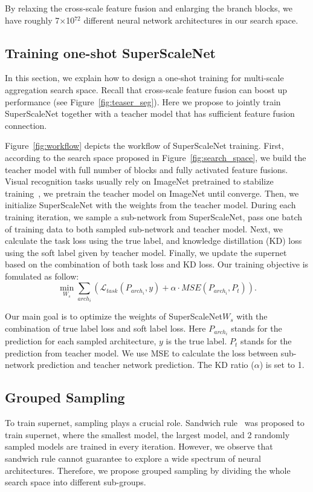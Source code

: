 \documentclass[final]{cvpr}
\newcommand{\supernet}{SuperScaleNet\xspace}
\begin{document}
By relaxing the cross-scale feature fusion and enlarging the branch blocks, we have roughly 7$\times$10$^{72}$  different neural network architectures in our search space.



\subsection{Training one-shot \supernet}
In this section, we explain how to design a one-shot training for multi-scale aggregation search space. 
Recall that cross-scale feature fusion can boost up performance (see Figure~\ref{fig:teaser_seg}).
Here we propose to jointly train \supernet together with a teacher model that has sufficient feature fusion connection.  

Figure~\ref{fig:workflow} depicts the workflow of \supernet training. 
First, according to the search space proposed in Figure~\ref{fig:search_space}, we build the teacher model with full number of blocks and fully activated feature fusions. 
Visual recognition tasks usually rely on ImageNet pretrained to stabilize training~\cite{wang2020deep,ren2015faster}, we pretrain the teacher model on ImageNet until converge. 
Then, we initialize \supernet with the weights from the teacher model. During each training iteration, we sample a sub-network from \supernet, pass one batch of training data to both sampled sub-network and teacher model. 
Next, we calculate the task loss using the true label, and knowledge distillation (KD) loss using the soft label given by teacher model.
Finally, we update the supernet based on the combination of both task loss and KD loss. 
Our training objective is fomulated as follow:
\begin{equation}
\min_{W_s} \sum_{arch_i} (\mathcal{L}_{task}(P_{arch_i}, y)+ \alpha \cdot MSE(P_{arch_i}, P_t)) .
\end{equation}

Our main goal is to optimize the weights of \supernet ${W_s}$
with the combination of true label loss and soft label loss.
Here $P_{arch_i}$ stands for the prediction for each sampled architecture, $y$ is the true label. $P_t$ stands for the prediction from teacher model. 
We use MSE to calculate the loss between sub-network prediction and teacher network prediction. The KD ratio ($\alpha$) is set to 1.


\subsection{Grouped Sampling}
\label{sec:grouped_sampling}
To train supernet, sampling plays a crucial role. 
Sandwich rule~\cite{yu2019universally,yu2020bignas} was proposed  to train supernet, where  the smallest model, the largest model, and 2 randomly sampled models are trained in every iteration.
However, we observe that sandwich rule cannot guarantee to explore a wide spectrum of neural architectures. Therefore, we propose grouped sampling by dividing the whole search space into different sub-groups. 
\end{document}
